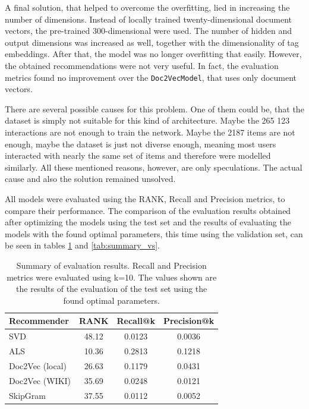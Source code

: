 A final solution, that helped to overcome the overfitting, lied in increasing the number of dimensions. Instead of locally trained twenty-dimensional document vectors, the pre-trained 300-dimensional were used. The number of hidden and output dimensions was increased as well, together with the dimensionality of tag embeddings. After that, the model was no longer overfitting that easily. However, the obtained recommendations were not very useful. In fact, the evaluation metrics found no improvement over the \texttt{Doc2VecModel}, that uses only document vectors. 

There are several possible causes for this problem. One of them could be, that the dataset is simply not suitable for this kind of architecture. Maybe the 265 123 interactions are not enough to train the network. Maybe the 2187 items are not enough, maybe the dataset is just not diverse enough, meaning most users interacted with nearly the same set of items and therefore were modelled similarly.
All these mentioned reasons, however, are only speculations. The actual cause and also the solution remained unsolved. 

All models were evaluated using the RANK, Recall and Precision metrics, to compare their performance. The comparison of the evaluation results obtained after optimizing the models using the test set and the results of evaluating the models with the found optimal parameters, this time using the validation set, can be seen in tables \ref{tab:summary_ts} and \ref{tab:summary_vs}.

\begin{table}[H]
    \centering
    \begin{tabular}{| l | c | c | c |}
        \hline
        Recommender & \textbf{RANK}  & \textbf{Recall@k} & \textbf{Precision@k} \\ \hline
        SVD       & 48.12 & 0.0123    & 0.0036       \\ \hline
        ALS       & 10.36 & 0.2813    & 0.1218       \\ \hline
        Doc2Vec (local)   & 26.63 & 0.1179    & 0.0431       \\ \hline
        Doc2Vec (WIKI)    &   35.69   &   0.0248  &   0.0121    \\ \hline
        SkipGram  & 37.55 & 0.0112    & 0.0052       \\ \hline
    \end{tabular}
    \caption{Summary of evaluation results. Recall and Precision metrics were evaluated using k=10. The values shown are the results of the evaluation of the test set using the found optimal parameters.}
    \label{tab:summary_ts}
\end{table}

